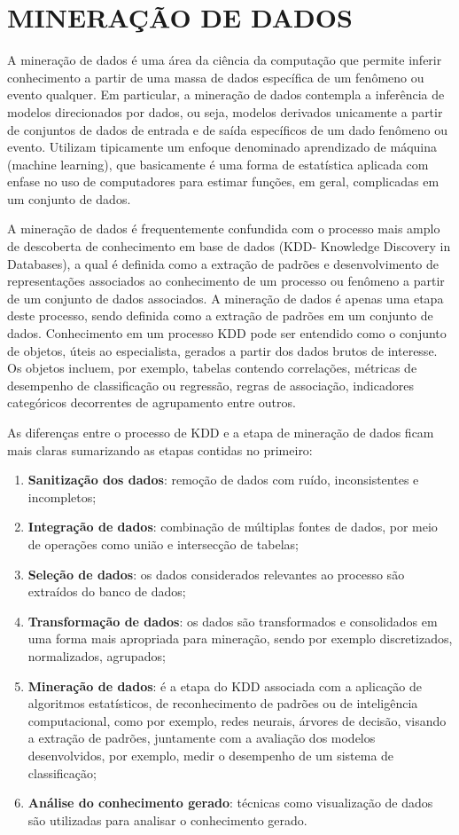 \chapter{MINERAÇÃO DE DADOS}

A mineração de dados é uma área da ciência da computação que permite inferir conhecimento a partir de uma massa de dados específica de um fenômeno ou evento qualquer. Em particular, a mineração de dados contempla a inferência de modelos direcionados por dados, ou seja, modelos derivados unicamente a partir de conjuntos de dados de entrada e de saída específicos de um dado fenômeno ou evento. Utilizam tipicamente um enfoque denominado aprendizado de máquina (machine learning), que basicamente é uma forma de estatística aplicada com enfase no uso de computadores para estimar funções, em geral, complicadas em um conjunto de dados.

A mineração de dados é frequentemente confundida com o processo mais amplo de descoberta de conhecimento em base de dados (KDD- Knowledge Discovery in Databases), a qual é definida como a extração de padrões e desenvolvimento de representações associados ao conhecimento de um processo ou fenômeno a partir de um conjunto de dados associados. A mineração de dados é apenas uma etapa deste processo, sendo definida como a extração de padrões em um conjunto de dados. Conhecimento em um processo KDD pode ser entendido como o conjunto de objetos, úteis ao especialista, gerados a partir dos dados brutos de interesse. Os objetos incluem, por exemplo, tabelas contendo correlações, métricas de desempenho de classificação ou regressão, regras de associação, indicadores categóricos decorrentes de agrupamento entre outros.

As diferenças entre o processo de KDD e a etapa de mineração de dados ficam mais claras sumarizando as etapas contidas no primeiro:

\begin{enumerate}
\item {\bf Sanitização dos dados}: remoção de dados com ruído, inconsistentes e incompletos;
\item {\bf Integração de dados}: combinação de múltiplas fontes de dados, por meio de operações como união e intersecção de tabelas;
\item {\bf Seleção de dados}: os dados considerados relevantes ao processo são extraídos do banco de dados;
\item {\bf Transformação de dados}: os dados são transformados e consolidados em uma forma mais apropriada para mineração, sendo por exemplo discretizados, normalizados, agrupados;
\item {\bf Mineração de dados}: é a etapa do KDD associada com a aplicação de algoritmos estatísticos, de reconhecimento de padrões ou de inteligência computacional, como por exemplo, redes neurais, árvores de decisão, visando a extração de padrões, juntamente com a avaliação dos modelos desenvolvidos, por exemplo, medir o desempenho de um sistema de classificação;
\item {\bf Análise do conhecimento gerado}: técnicas como visualização de dados são utilizadas para analisar o conhecimento gerado.
\end{enumerate}

